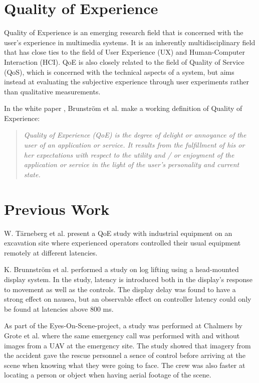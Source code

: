 \documentclass[nofilelist]{cslthse-msc}
\begin{document}
\section{Quality of Experience}
Quality of Experience is an emerging research field that is concerned with the user's experience in multimedia systems. It is an inherently multidisciplinary field that has close ties to the field of User Experience (UX) and Human-Computer Interaction (HCI). QoE is also closely related to the field of Quality of Service (QoS), which is concerned with the technical aspects of a system, but aims instead at evaluating the subjective experience through user experiments rather than qualitative measurements.

In the white paper \cite{qoe-definition}, Brunström et al. make a working definition of Quality of Experience: 

\begin{quote}
   \textit{Quality of Experience (QoE) is the degree of delight or annoyance of the user of an application or service. It results from the fulfillment of his or her expectations with respect to the utility and / or enjoyment of the application or service in the light of the user’s personality and current state.} 
\end{quote}


\section{Previous Work}

W. Tärneberg et al. \cite{industry4.0} present a QoE study with industrial equipment on an excavation site where experienced operators controlled their usual equipment remotely at different latencies. 

K. Brunnström et al. \cite{latency-impact} performed a study on log lifting using a head-mounted display system. In the study, latency is introduced both in the display's response to movement as well as the controls. The display delay was found to have a strong effect on nausea, but an observable effect on controller latency could only be found at latencies above 800 ms. 

As part of the Eyes-On-Scene-project, a study was performed at Chalmers by Grote et al. \cite{eos-maritime} where the same emergency call was performed with and without images from a UAV at the emergency site. The study showed that imagery from the accident gave the rescue personnel a sence of control before arriving at the scene when knowing what they were going to face. The crew was also faster at locating a person or object when having aerial footage of the scene.
\end{document}
